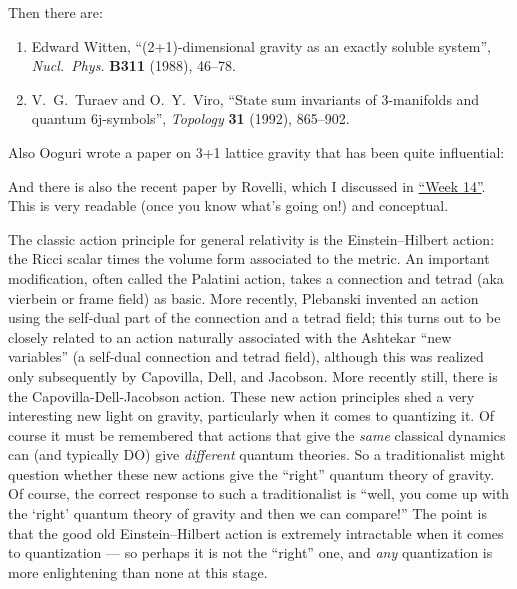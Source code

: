 \documentclass[12pt]{article}
\def\tightlist{}
\renewcommand{\texttt}[1]{%
  \begingroup
  \ttfamily
  \begingroup\lccode`~=`/\lowercase{\endgroup\def~}{/\discretionary{}{}{}}%
  \begingroup\lccode`~=`[\lowercase{\endgroup\def~}{[\discretionary{}{}{}}%
  \begingroup\lccode`~=`.\lowercase{\endgroup\def~}{.\discretionary{}{}{}}%
  \catcode`/=\active\catcode`[=\active\catcode`.=\active
  \scantokens{#1\noexpand}%
  \endgroup
}
\begin{document}
Then there are:

\begin{enumerate}
\def\labelenumi{\arabic{enumi})}
\setcounter{enumi}{6}
\item
  Edward Witten, ``(2+1)-dimensional gravity as an exactly soluble system'', 
  \emph{Nucl.\ Phys.} \textbf{B311} (1988), 46--78.
\item
  V.\ G.\ Turaev and O.\ Y.\ Viro,  ``State sum invariants of 3-manifolds and 
  quantum 6j-symbols'', \emph{Topology} \textbf{31} (1992), 865--902.
\end{enumerate}

Also Ooguri wrote a paper on 3+1 lattice gravity that has been quite
influential:

\noindent
And there is also the recent paper by Rovelli, which I discussed in
\protect\hyperlink{week14}{``Week 14''}. This is very readable (once you
know what's going on!) and conceptual.


The classic action principle for general relativity is the
Einstein--Hilbert action: the Ricci scalar times the volume form
associated to the metric. An important modification, often called the
Palatini action, takes a connection and tetrad (aka vierbein or frame
field) as basic. More recently, Plebanski invented an action using the
self-dual part of the connection and a tetrad field; this turns out to
be closely related to an action naturally associated with the Ashtekar
``new variables'' (a self-dual connection and tetrad field), although
this was realized only subsequently by Capovilla, Dell, and Jacobson.
More recently still, there is the Capovilla-Dell-Jacobson action. These
new action principles shed a very interesting new light on gravity,
particularly when it comes to quantizing it. Of course it must be
remembered that actions that give the \emph{same} classical dynamics can
(and typically DO) give \emph{different} quantum theories. So a
traditionalist might question whether these new actions give the
``right'' quantum theory of gravity. Of course, the correct response to
such a traditionalist is ``well, you come up with the `right' quantum
theory of gravity and then we can compare!'' The point is that the good
old Einstein--Hilbert action is extremely intractable when it comes to
quantization --- so perhaps it is not the ``right'' one, and \emph{any}
quantization is more enlightening than none at this stage.
\end{document}
